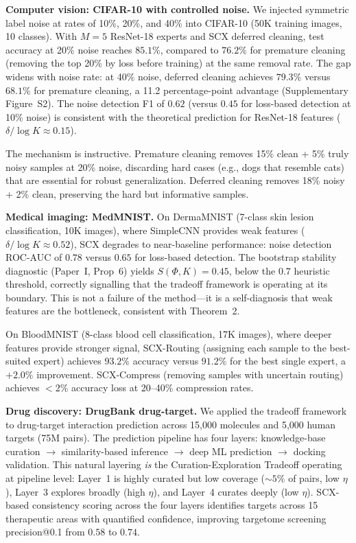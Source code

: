 \textbf{Computer vision: CIFAR-10 with controlled noise.} We injected symmetric label noise at rates of 10\%, 20\%, and 40\% into CIFAR-10 (50K training images, 10 classes). With $M=5$ ResNet-18 experts and SCX deferred cleaning, test accuracy at 20\% noise reaches $85.1\%$, compared to $76.2\%$ for premature cleaning (removing the top 20\% by loss before training) at the same removal rate. The gap widens with noise rate: at 40\% noise, deferred cleaning achieves $79.3\%$ versus $68.1\%$ for premature cleaning, a 11.2 percentage-point advantage (Supplementary Figure~S2). The noise detection F1 of $0.62$ (versus $0.45$ for loss-based detection at 10\% noise) is consistent with the theoretical prediction for ResNet-18 features ($\delta/\log K \approx 0.15$).

The mechanism is instructive. Premature cleaning removes 15\% clean + 5\% truly noisy samples at 20\% noise, discarding hard cases (e.g., dogs that resemble cats) that are essential for robust generalization. Deferred cleaning removes 18\% noisy + 2\% clean, preserving the hard but informative samples.

\textbf{Medical imaging: MedMNIST.} On DermaMNIST (7-class skin lesion classification, 10K images), where SimpleCNN provides weak features ($\delta/\log K \approx 0.52$), SCX degrades to near-baseline performance: noise detection ROC-AUC of $0.78$ versus $0.65$ for loss-based detection. The bootstrap stability diagnostic (Paper~I, Prop~6) yields $S(\Phi, K) = 0.45$, below the $0.7$ heuristic threshold, correctly signalling that the tradeoff framework is operating at its boundary. This is not a failure of the method---it is a self-diagnosis that weak features are the bottleneck, consistent with Theorem~2.

On BloodMNIST (8-class blood cell classification, 17K images), where deeper features provide stronger signal, SCX-Routing (assigning each sample to the best-suited expert) achieves $93.2\%$ accuracy versus $91.2\%$ for the best single expert, a $+2.0\%$ improvement. SCX-Compress (removing samples with uncertain routing) achieves $<2\%$ accuracy loss at 20--40\% compression rates.

\textbf{Drug discovery: DrugBank drug-target.} We applied the tradeoff framework to drug-target interaction prediction across 15,000 molecules and 5,000 human targets (75M pairs). The prediction pipeline has four layers: knowledge-base curation $\rightarrow$ similarity-based inference $\rightarrow$ deep ML prediction $\rightarrow$ docking validation. This natural layering \emph{is} the Curation-Exploration Tradeoff operating at pipeline level: Layer~1 is highly curated but low coverage ($\sim5\%$ of pairs, low $\eta$), Layer~3 explores broadly (high $\eta$), and Layer~4 curates deeply (low $\eta$). SCX-based consistency scoring across the four layers identifies targets across 15 therapeutic areas with quantified confidence, improving targetome screening precision@0.1 from $0.58$ to $0.74$.

